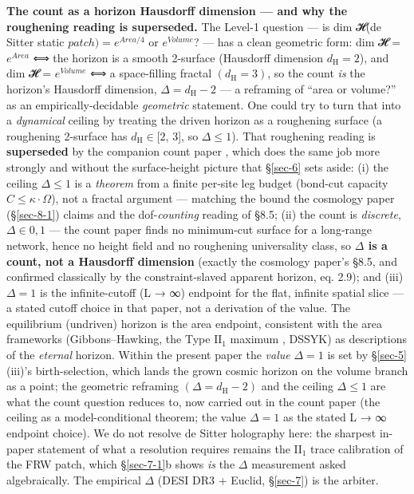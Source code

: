 \documentclass[aps,prd,preprint,nofootinbib,superscriptaddress]{revtex4-2}
\begin{document}
\textbf{The count as a horizon Hausdorff dimension --- and why the
roughening reading is superseded.} The Level-1 question --- is dim 𝓗(de
Sitter static \(patch) = e^{Area/4}\) or \(e^{Volume}\)? --- has a clean
geometric form: dim 𝓗 = \(e^{Area}\) ⟺ the horizon is a smooth 2-surface
(Hausdorff dimension \(d_{\mathrm{H}} = 2\)), and dim 𝓗 = \(e^{Volume}\)
⟺ a space-filling fractal \((d_{\mathrm{H}} = 3)\), so the count
\emph{is} the horizon's Hausdorff dimension,
\(\Delta  = d_{\mathrm{H}} - 2\) --- a reframing of ``area or volume?''
as an empirically-decidable \emph{geometric} statement. One could try to
turn that into a \emph{dynamical} ceiling by treating the driven horizon
as a roughening surface (a roughening 2-surface has
\(d_{\mathrm{H}} \in  [2\), 3{]}, so \(\Delta  \leq  1\)). That
roughening reading is \textbf{superseded} by the companion count paper
\cite{Pandev:2026count}, which does the same job more strongly and
without the surface-height picture that §\ref{sec-6} sets aside: (i) the
ceiling \(\Delta  \leq  1\) is a \emph{theorem} from a finite per-site
leg budget (bond-cut capacity
\(C \leq  \kappa \cdot\)\textbar{}\(\Omega\)\textbar), not a fractal
argument --- matching the bound the cosmology paper (§\ref{sec-8-1})
\cite{Pandev:2026cosmology} claims and the dof-\emph{counting} reading
of §8.5; (ii) the count is \emph{discrete}, \(\Delta  \in  {0, 1}\) ---
the count paper finds no minimum-cut surface for a long-range network,
hence no height field and no roughening universality class, so
\textbf{\(\Delta\) is a count, not a Hausdorff dimension} (exactly the
cosmology paper's §8.5, and confirmed classically by the
constraint-slaved apparent horizon, eq. 2.9); and (iii) \(\Delta  = 1\)
is the infinite-cutoff (L → ∞) endpoint for the flat, infinite spatial
slice --- a stated cutoff choice in that paper, not a derivation of the
value. The equilibrium (undriven) horizon is the area endpoint,
consistent with the area frameworks (Gibbons--Hawking, the Type
\(\mathrm{II}_{1}\) maximum \cite{Chandrasekaran:2022cip}, DSSYK) as
descriptions of the \emph{eternal} horizon. Within the present paper the
\emph{value} \(\Delta  = 1\) is set by §\ref{sec-5} (iii)'s
birth-selection, which lands the grown cosmic horizon on the volume
branch as a point; the geometric reframing
\((\Delta  = d_{\mathrm{H}} - 2)\) and the ceiling \(\Delta  \leq  1\)
are what the count question reduces to, now carried out in the count
paper (the ceiling as a model-conditional theorem; the value
\(\Delta  = 1\) as the stated L → ∞ endpoint choice). We do not resolve
de Sitter holography here: the sharpest in-paper statement of what a
resolution requires remains the \(\mathrm{II}_{1}\) trace calibration of
the FRW patch, which §\ref{sec-7-1}b shows \emph{is} the \(\Delta\)
measurement asked algebraically. The empirical \(\Delta\) (DESI DR3 +
Euclid, §\ref{sec-7}) is the arbiter.
\end{document}
